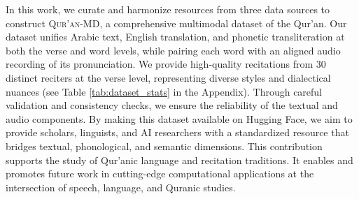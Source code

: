 In this work, we curate and harmonize resources from three data sources to construct \textsc{Qur’an-MD}, a comprehensive multimodal dataset of the Qur’an. Our dataset unifies Arabic text, English translation, and phonetic transliteration at both the verse and word levels, while pairing each word with an aligned audio recording of its pronunciation. We provide high-quality recitations from 30 distinct reciters at the verse level, representing diverse styles and dialectical nuances (see Table \ref{tab:dataset_stats} in the Appendix). Through careful validation and consistency checks, we ensure the reliability of the textual and audio components. By making this dataset available on Hugging Face, we aim to provide scholars, linguists, and AI researchers with a standardized resource that bridges textual, phonological, and semantic dimensions. This contribution supports the study of Qur’anic language and recitation traditions. It enables and promotes future work in cutting-edge computational applications at the intersection of speech, language, and Quranic studies.